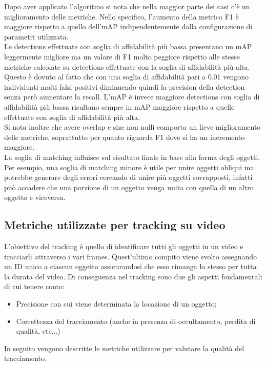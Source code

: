 Dopo aver applicato l'algoritmo si nota che nella maggior parte dei casi c'è un miglioramento delle metriche. Nello specifico, l'aumento della metrica F1 è maggiore rispetto a quello dell'mAP indipendentemente dalla configurazione di parametri utilizzata.\\
Le detections effettuate con soglia di affidabilità più bassa presentano un mAP leggermente migliore ma un valore di F1 molto peggiore rispetto alle stesse metriche calcolate su detections effettuate con la soglia di affidabilità più alta. Questo è dovuto al fatto che con una soglia di affidabilità pari a 0.01 vengono individuati molti falsi positivi diminuendo quindi la precision della detection senza però aumentare la recall. L'mAP è invece maggiore detections con soglia di affidabilità più bassa risultano sempre in mAP maggiore rispetto a quelle effettuate con soglia di affidabilità più alta.\\
Si nota inoltre che avere overlap e size non nulli comporta un lieve miglioramento delle metriche, soprattutto per quanto riguarda F1 dove si ha un incremento maggiore.\\
La soglia di matching influisce sul risultato finale in base alla forma degli oggetti. Per esempio, una soglia di matching minore è utile per unire oggetti obliqui ma potrebbe generare degli errori cercando di unire più oggetti sovrapposti, infatti può accadere che una porzione di un oggetto venga unita con quella di un altro oggetto e viceversa.


\subsection{Metriche utilizzate per tracking su video}
L'obiettivo del tracking è quello di identificare tutti gli oggetti in un video e tracciarli attraverso i vari frames. Quest'ultimo compito viene svolto assegnando un ID unico a ciascun oggetto assicurandosi che esso rimanga lo stesso per tutta la durata del video. Di conseguenza nel tracking sono due gli aspetti fondamentali di cui tenere conto:
\begin{itemize}
\item Precisione con cui viene determinata la locazione di un oggetto;
\item Correttezza del tracciamento (anche in presenza di occultamento, perdita di qualità, etc...)
\end{itemize}
In seguito vengono descritte le metriche utilizzare per valutare la qualità del tracciamento.

